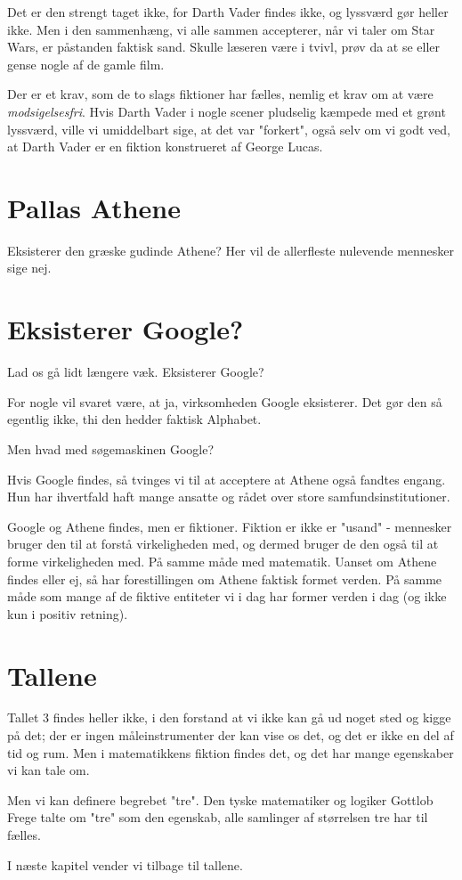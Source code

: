 Det er den strengt taget ikke, for Darth Vader findes ikke, og lyssværd gør heller ikke. Men i den sammenhæng, vi alle sammen accepterer, når vi taler om Star Wars,  er påstanden faktisk sand. Skulle læseren være i tvivl, prøv da at se eller gense nogle af de gamle film. 

Der er et krav, som de to slags fiktioner har fælles, nemlig et krav om at være \emph{modsigelsesfri}. Hvis Darth Vader i nogle scener pludselig kæmpede med et grønt lyssværd, ville vi umiddelbart sige, at det var "forkert", også selv om vi godt ved, at Darth Vader er en fiktion konstrueret af George Lucas.

\section{Pallas Athene}

Eksisterer den græske gudinde Athene? Her vil de allerfleste nulevende mennesker sige nej.

\section{Eksisterer Google?}

Lad os gå lidt længere væk. Eksisterer Google?

For nogle vil svaret være, at ja, virksomheden Google eksisterer. Det gør den så egentlig ikke, thi den hedder faktisk Alphabet. 

Men hvad med søgemaskinen Google?

Hvis Google findes, så tvinges vi til at acceptere at Athene også  fandtes engang. Hun har ihvertfald haft mange ansatte og rådet over store samfundsinstitutioner.

Google og Athene findes, men er fiktioner. Fiktion er ikke er "usand" - mennesker bruger den til at forstå virkeligheden med, og dermed bruger de den også til at forme virkeligheden med. På samme måde med matematik.
Uanset om Athene findes eller ej, så har forestillingen om Athene faktisk formet verden. På samme måde som mange af de fiktive entiteter vi i dag har former verden i dag (og ikke kun i positiv retning).

\section{Tallene}

Tallet 3 findes heller ikke, i den forstand at vi ikke kan gå ud noget sted og kigge på det; der er ingen måleinstrumenter der kan vise os det, og det er ikke en del af tid og rum. Men i matematikkens fiktion findes det, og det har mange egenskaber vi kan tale om.

Men vi kan definere begrebet "tre". Den tyske matematiker og logiker Gottlob Frege talte om "tre" som den egenskab, alle samlinger af størrelsen tre har til fælles.

I næste kapitel vender vi tilbage til tallene.


